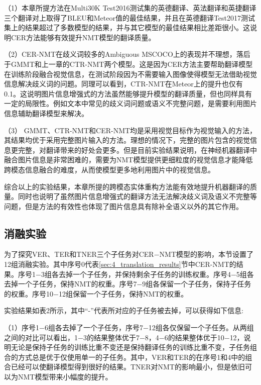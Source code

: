 （1）本章所提方法在Multi30K Test2016测试集的英德翻译、英法翻译和英捷翻译三个翻译对上取得了BLEU和Meteor值的最佳结果，并且在英德翻译Test2017测试集上的结果超过了多数模型的结果，并与其它模型的最佳结果相比差距很小。这说明CER方法能够有效提升NMT模型的翻译质量。

（2）CER-NMT在歧义词较多的Ambiguous MSCOCO上的表现并不理想，落后于GMMT和上一章的CTR-NMT两个模型。这是因为CER方法主要帮助翻译模型在训练阶段融合视觉信息，在测试阶段因为不需要输入图像使得模型无法借助视觉信息解决歧义词的问题。同理可以看到，CTR-NMT在Meteor上的提升也仅有0.1。这说明图片信息增强式的方法虽然能够提升模型的翻译质量，但也同样具有一定的局限性。例如文本中常见的歧义词问题或语义不完整问题，是需要利用图片信息辅助翻译模型来解决。

（3）%
GMMT、CTR-NMT和CER-NMT均是采用视觉目标作为视觉输入的方法，其结果均优于采用完整图片输入的方法。理想的情况下，完整的图片包含的视觉信息更完整，对翻译带来的好处会更多。但是目前实验结果说明，在神经机器翻译中融合图片信息是非常困难的，需要为NMT模型提供更细粒度的视觉信息才能降低跨模态信息融合的难度，从而使模型更多地利用图片中的视觉信息。

综合以上的实验结果，本章所提的跨模态实体重构方法能有效地提升机器翻译的质量。同时也说明了虽然图片信息增强式的翻译方法无法解决歧义词及语义不完整等问题，但是方法的有效性也体现了图片信息具有除补全语义以外的其它作用。

\subsection{消融实验}
\label{sec:4_ablation_study}
为了探究VER、TER和TNER三个子任务对CER$-$NMT模型的影响，本节设置了12组消融实验。其中序号0代表\ref{sec:4_translation_results}节中CER-NMT的结果。序号1$-$3组各去掉一个子任务，并保持剩余子任务的训练权重。序号4$-$5组各去掉一个子任务，保持NMT的权重。序号7$-$9组各保留一个子任务，保持子任务的权重。序号10$-$12组保留一个子任务，保持NMT的权重。


实验结果如表2所示，其中“-”代表所对应的子任务被去掉，可以获得如下信息:

（1）序号1$-$6组各去掉了一个子任务，序号7$-$12组各仅保留一个子任务。从两组之间的对比可以看出，1$-$3的结果整体优于7$-$8，4$-$6的结果整体优于10$-$12，说明无论是保持子任务的训练比重不变还是保持翻译任务的训练比重不变，子任务组合的方式总是优于仅使用单一的子任务。其中，VER和TER的在序号1和4中的组合已经可以使翻译模型得到很好的结果。TNER对NMT的影响最小，但是依旧可以为NMT模型带来小幅度的提升。

